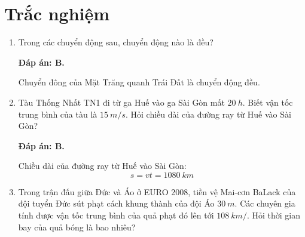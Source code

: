 \whiteBGstarBegin
\setcounter{section}{0}
\section{Trắc nghiệm}
\begin{enumerate}[label=\bfseries Câu \arabic*:]
	\item {}
	
	\cauhoi
	{Trong các chuyển động sau, chuyển động nào là đều?
	}
	
	\loigiai
	{		\textbf{Đáp án: B.}
		
		Chuyển đông của Mặt Trăng quanh Trái Đất là chuyển động đều.
		
	}
	\item {}
	
	\cauhoi
	{Tàu Thống Nhất TN1 đi từ ga Huế vào ga Sài Gòn mất $\SI{20}{h}$. Biết vận tốc trung bình của tàu là $\SI{15}{m/s}$. Hỏi chiều dài của đường ray từ Huế vào Sài Gòn?
	}
	
	\loigiai
	{		\textbf{Đáp án: B.}
		
	Chiều dài của đường ray từ Huế vào Sài Gòn:
	$$s=vt=\SI{1080}{km}$$
		
	}
	\item {}
	
	\cauhoi
	{Trong trận đấu giữa Đức và Áo ở EURO 2008, tiền vệ Mai-cơn BaLack của đội tuyển Đức sút phạt cách khung thành của đội Áo $\SI{30}{m}$. Các chuyên gia tính được vận tốc trung bình của quả phạt đó lên tới $\SI{108}{km/}$. Hỏi thời gian bay của quả bóng là bao nhiêu?
	}
	

\end{enumerate}
